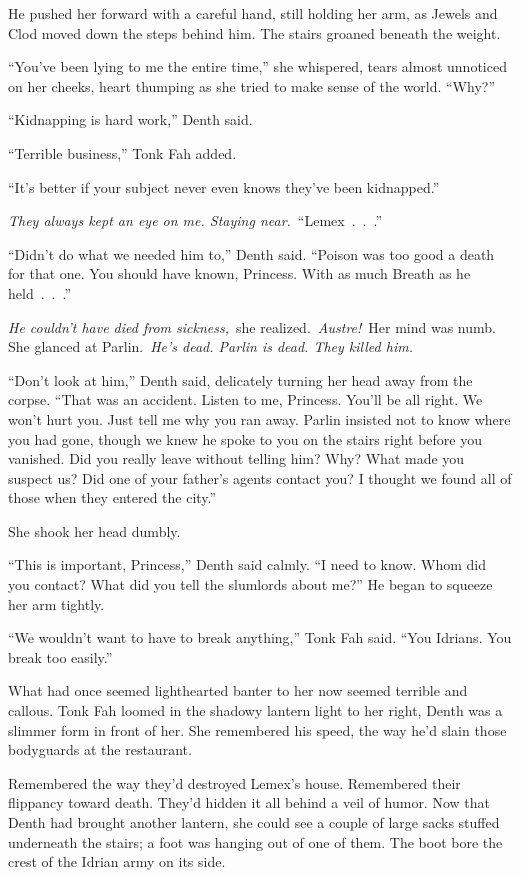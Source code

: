 He pushed her forward with a careful hand, still holding her arm, as Jewels and Clod moved down the steps behind him. The stairs groaned beneath the weight.

“You’ve been lying to me the entire time,” she whispered, tears almost unnoticed on her cheeks, heart thumping as she tried to make sense of the world. “Why?”

“Kidnapping is hard work,” Denth said.

“Terrible business,” Tonk Fah added.

“It’s better if your subject never even knows they’ve been kidnapped.”

\textit{They always kept an eye on me. Staying near.}~“Lemex~.~.~.”

“Didn’t do what we needed him to,” Denth said. “Poison was too good a death for that one. You should have known, Princess. With as much Breath as he held~.~.~.”

\textit{He couldn’t have died from sickness,}~she realized.~\textit{Austre!}~Her mind was numb. She glanced at Parlin.~\textit{He’s dead. Parlin is dead. They killed him.}

“Don’t look at him,” Denth said, delicately turning her head away from the corpse. “That was an accident. Listen to me, Princess. You’ll be all right. We won’t hurt you. Just tell me why you ran away. Parlin insisted not to know where you had gone, though we knew he spoke to you on the stairs right before you vanished. Did you really leave without telling him? Why? What made you suspect us? Did one of your father’s agents contact you? I thought we found all of those when they entered the city.”

She shook her head dumbly.

“This is important, Princess,” Denth said calmly. “I need to know. Whom did you contact? What did you tell the slumlords about me?” He began to squeeze her arm tightly.

“We wouldn’t want to have to break anything,” Tonk Fah said. “You Idrians. You break too easily.”

What had once seemed lighthearted banter to her now seemed terrible and callous. Tonk Fah loomed in the shadowy lantern light to her right, Denth was a slimmer form in front of her. She remembered his speed, the way he’d slain those bodyguards at the restaurant.

Remembered the way they’d destroyed Lemex’s house. Remembered their flippancy toward death. They’d hidden it all behind a veil of humor. Now that Denth had brought another lantern, she could see a couple of large sacks stuffed underneath the stairs; a foot was hanging out of one of them. The boot bore the crest of the Idrian army on its side.

